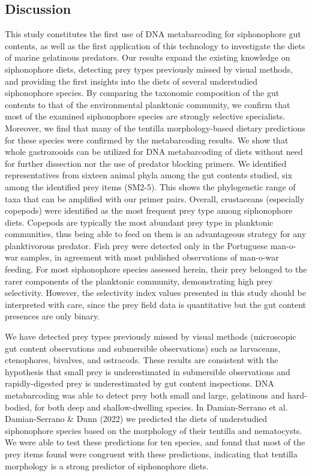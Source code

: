 \documentclass[12pt,]{article}
\begin{document}
\hypertarget{discussion}{%
\subsection*{Discussion}\label{discussion}}

This study constitutes the first use of DNA metabarcoding for siphonophore gut contents, as well as the first application of this technology to investigate the diets of marine gelatinous predators. Our results expand the existing knowledge on siphonophore diets, detecting prey types previously missed by visual methods, and providing the first insights into the diets of several understudied siphonophore species. By comparing the taxonomic composition of the gut contents to that of the environmental planktonic community, we confirm that most of the examined siphonophore species are strongly selective specialists. Moreover, we find that many of the tentilla morphology-based dietary predictions for these species were confirmed by the metabarcoding results. We show that whole gastrozooids can be utilized for DNA metabarcoding of diets without need for further dissection nor the use of predator blocking primers.
We identified representatives from sixteen animal phyla among the gut contents studied, six among the identified prey items (SM2-5). This shows the phylogenetic range of taxa that can be amplified with our primer pairs. Overall, crustaceans (especially copepods) were identified as the most frequent prey type among siphonophore diets. Copepods are typically the most abundant prey type in planktonic communities, thus being able to feed on them is an advantageous strategy for any planktivorous predator. Fish prey were detected only in the Portuguese man-o-war samples, in agreement with most published observations of man-o-war feeding. For most siphonophore species assessed herein, their prey belonged to the rarer components of the planktonic community, demonstrating high prey selectivity. However, the selectivity index values presented in this study should be interpreted with care, since the prey field data is quantitative but the gut content presences are only binary.

We have detected prey types previously missed by visual methods (microscopic gut content observations and submersible observations) such as larvaceans, ctenophores, bivalves, and ostracods. These results are consistent with the hypothesis that small prey is underestimated in submersible observations and rapidly-digested prey is underestimated by gut content inspections. DNA metabarcoding was able to detect prey both small and large, gelatinous and hard-bodied, for both deep and shallow-dwelling species. In Damian-Serrano et al. Damian-Serrano \& Dunn (2022) we predicted the diets of understudied siphonophore species based on the morphology of their tentilla and nematocysts. We were able to test these predictions for ten species, and found that most of the prey items found were congruent with these predictions, indicating that tentilla morphology is a strong predictor of siphonophore diets.
\end{document}
